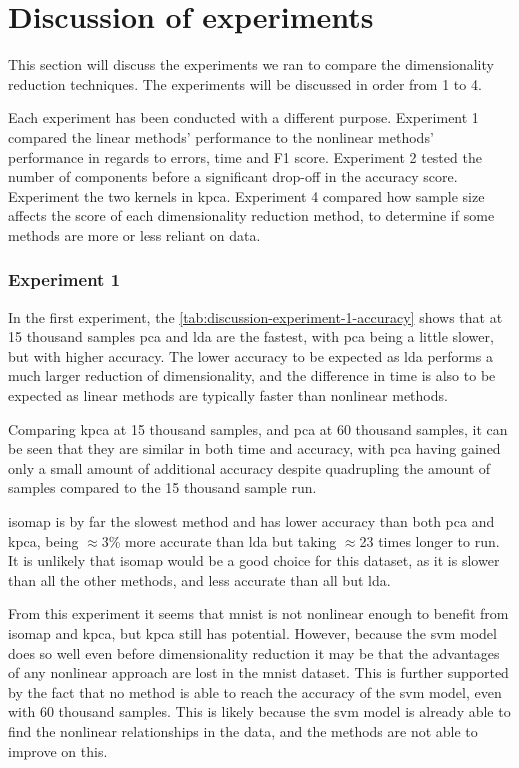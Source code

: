 \section{Discussion of experiments} \label{sec:experiments}
This section will discuss the experiments we ran to compare the dimensionality reduction techniques. The experiments will be discussed in order from 1 to 4.

Each experiment has been conducted with a different purpose. Experiment 1 compared the linear methods' performance to the nonlinear methods' performance in regards to errors, time and F1 score. Experiment 2 tested the number of components before a significant drop-off in the accuracy score. Experiment the two kernels in \gls{kpca}. Experiment 4 compared how sample size affects the score of each dimensionality reduction method, to determine if some methods are more or less reliant on data.


\subsubsection{Experiment 1}\label{subsec:experiment-1}
In the first experiment, the \autoref{tab:discussion-experiment-1-accuracy} shows that at 15 thousand samples \gls{pca} and \gls{lda} are the fastest, with \gls{pca} being a little slower, but with higher accuracy. The lower accuracy to be expected as \gls{lda} performs a much larger reduction of dimensionality, and the difference in time is also to be expected as linear methods are typically faster than nonlinear methods.

Comparing \gls{kpca} at 15 thousand samples, and \gls{pca} at 60 thousand samples, it can be seen that they are similar in both time and accuracy, with \gls{pca} having gained only a small amount of additional accuracy despite quadrupling the amount of samples compared to the 15 thousand sample run.

\gls{isomap} is by far the slowest method and has lower accuracy than both \gls{pca} and \gls{kpca}, being $\approx$3\% more accurate than \gls{lda} but taking $\approx$23 times longer to run. It is unlikely that \gls{isomap} would be a good choice for this dataset, as it is slower than all the other methods, and less accurate than all but \gls{lda}.

From this experiment it seems that \gls{mnist} is not nonlinear enough to benefit from \gls{isomap} and \gls{kpca}, but \gls{kpca} still has potential. However, because the \gls{svm} model does so well even before dimensionality reduction it may be that the advantages of any nonlinear approach are lost in the \gls{mnist} dataset. This is further supported by the fact that no method is able to reach the accuracy of the \gls{svm} model, even with 60 thousand samples. This is likely because the \gls{svm} model is already able to find the nonlinear relationships in the data, and the methods are not able to improve on this.


